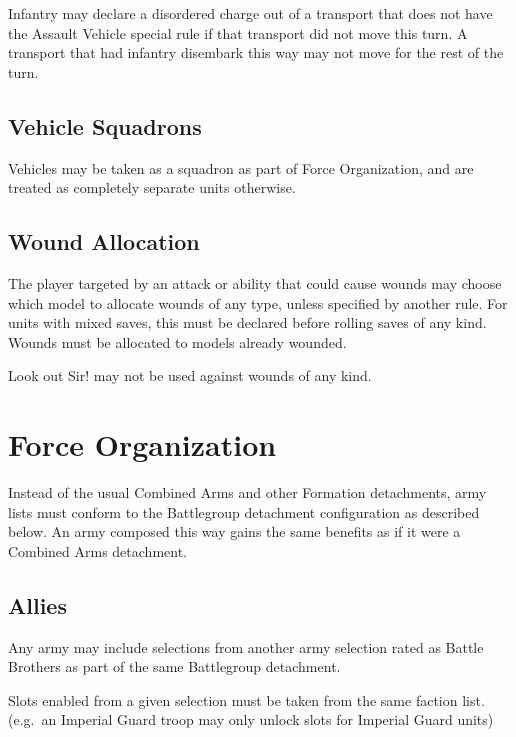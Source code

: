 \documentclass[letterpaper,twocolumn,oneside,titlepage]{book}
\begin{document}
Infantry may declare a disordered charge out of a transport that does
not have the Assault Vehicle special rule if that transport did not move
this turn. A transport that had infantry disembark this way may not move
for the rest of the turn.

\section{\texorpdfstring{\textbf{Vehicle
Squadrons}}{Vehicle Squadrons}}\label{vehicle-squadrons}

Vehicles may be taken as a squadron as part of Force Organization, and
are treated as completely separate units otherwise.

\section{\texorpdfstring{\textbf{Wound
Allocation}}{Wound Allocation}}\label{wound-allocation}

The player targeted by an attack or ability that could cause wounds may
choose which model to allocate wounds of any type, unless specified by
another rule. For units with mixed saves, this must be declared before
rolling saves of any kind. Wounds must be allocated to models already
wounded.

Look out Sir! may not be used against wounds of any kind.

\chapter{\texorpdfstring{\textbf{Force
Organization}}{Force Organization}}\label{force-organization}

Instead of the usual Combined Arms and other Formation detachments, army
lists must conform to the Battlegroup detachment configuration as
described below. An army composed this way gains the same benefits as if
it were a Combined Arms detachment.

\section{\texorpdfstring{\textbf{Allies}}{Allies}}\label{allies}

Any army may include selections from another army selection rated as
Battle Brothers as part of the same Battlegroup detachment.

Slots enabled from a given selection must be taken from the same faction
list. (e.g.~an Imperial Guard troop may only unlock slots for Imperial
Guard units)
\end{document}
